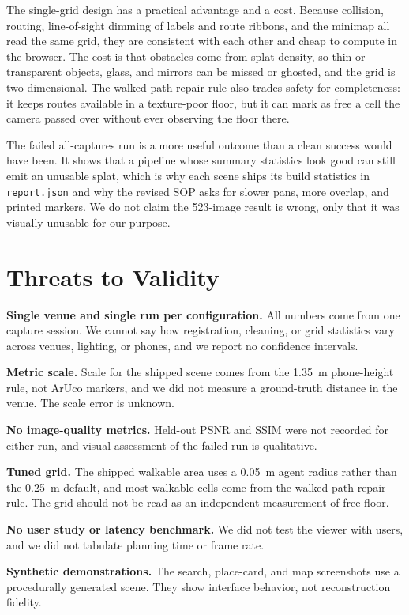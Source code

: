 \documentclass[conference]{IEEEtran}
\begin{document}
The single-grid design has a practical advantage and a cost. Because collision, routing, line-of-sight dimming of labels and route ribbons, and the minimap all read the same grid, they are consistent with each other and cheap to compute in the browser. The cost is that obstacles come from splat density, so thin or transparent objects, glass, and mirrors can be missed or ghosted, and the grid is two-dimensional. The walked-path repair rule also trades safety for completeness: it keeps routes available in a texture-poor floor, but it can mark as free a cell the camera passed over without ever observing the floor there.

The failed all-captures run is a more useful outcome than a clean success would have been. It shows that a pipeline whose summary statistics look good can still emit an unusable splat, which is why each scene ships its build statistics in \texttt{report.json} and why the revised SOP asks for slower pans, more overlap, and printed markers. We do not claim the 523-image result is wrong, only that it was visually unusable for our purpose.

\section{Threats to Validity}
\textbf{Single venue and single run per configuration.} All numbers come from one capture session. We cannot say how registration, cleaning, or grid statistics vary across venues, lighting, or phones, and we report no confidence intervals.

\textbf{Metric scale.} Scale for the shipped scene comes from the 1.35~m phone-height rule, not ArUco markers, and we did not measure a ground-truth distance in the venue. The scale error is unknown.

\textbf{No image-quality metrics.} Held-out PSNR and SSIM were not recorded for either run, and visual assessment of the failed run is qualitative.

\textbf{Tuned grid.} The shipped walkable area uses a 0.05~m agent radius rather than the 0.25~m default, and most walkable cells come from the walked-path repair rule. The grid should not be read as an independent measurement of free floor.

\textbf{No user study or latency benchmark.} We did not test the viewer with users, and we did not tabulate planning time or frame rate.

\textbf{Synthetic demonstrations.} The search, place-card, and map screenshots use a procedurally generated scene. They show interface behavior, not reconstruction fidelity.
\end{document}
